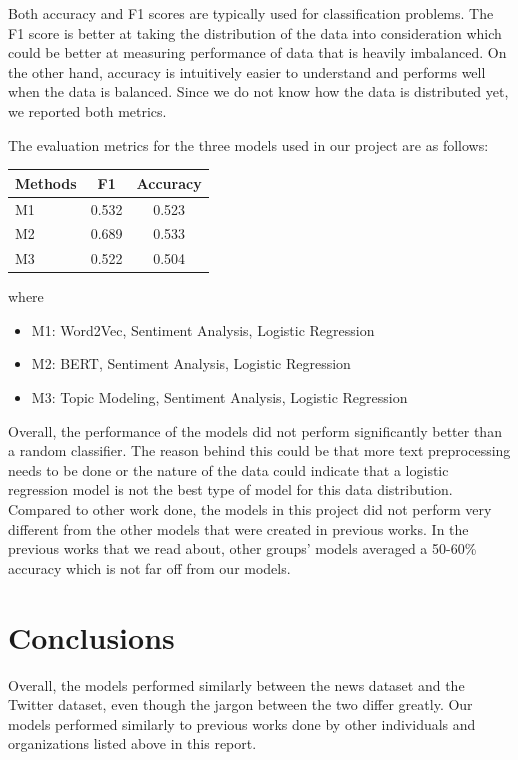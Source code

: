 \documentclass[conference]{IEEEtran}
\begin{document}
Both accuracy and F1 scores are typically used for classification problems. The F1 score is better at taking the distribution of the data into consideration which could be better at measuring performance of data that is heavily imbalanced. On the other hand, accuracy is intuitively easier to understand and performs well when the data is balanced. Since we do not know how the data is distributed yet, we reported both metrics.

The evaluation metrics for the three models used in our project are as follows:




\begin{table}[htp]
    \begin{center}
        \begin{tabular}{|l||c|c|} \hline\hline
            Methods                                               & F1         & Accuracy  \\ \hline
            M1                    & 0.532        & 0.523   \\
            M2 & 0.689       & 0.533   \\
            M3                  & 0.522 & 0.504   \\
            \hline\hline
        \end{tabular}
    \end{center}
\end{table}
where

\begin{itemize}
 \item M1: Word2Vec, Sentiment Analysis, Logistic Regression
 \item M2: BERT, Sentiment Analysis, Logistic Regression
 \item M3: Topic Modeling, Sentiment Analysis, Logistic Regression
\end{itemize}

Overall, the performance of the models did not perform significantly better than a random classifier. The reason behind this could be that more text preprocessing needs to be done or the nature of the data could indicate that a logistic regression model is not the best type of model for this data distribution. Compared to other work done, the models in this project did not perform very different from the other models that were created in previous works. In the previous works that we read about, other groups' models averaged a 50-60\% accuracy which is not far off from our models. 

\section{Conclusions}
Overall, the models performed similarly between the news dataset and the Twitter dataset, even though the jargon between the two differ greatly. Our models performed similarly to previous works done by other individuals and organizations listed above in this report. 
\end{document}
